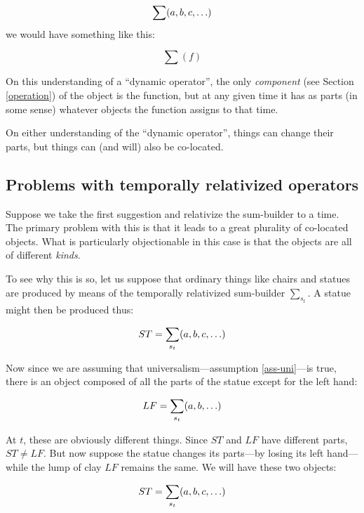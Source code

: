 \documentclass[11pt]{article}
\begin{document}
\begin{spacing}{1.5}
\begin{displaymath}
\sum (a, b, c, \mathellipsis )
\end{displaymath}
we would have something like this:

\begin{displaymath}
\sum ( f )
\end{displaymath}

On this understanding of a ``dynamic operator'', the only {\em
  component} (see Section \ref{operation}) of the object is the
function, but at any given time it has as parts (in some sense)
whatever objects the function assigns to that time.

On either understanding of the ``dynamic operator'', things can change
their parts, but things can (and will) also be co-located.

\subsection{Problems with temporally relativized operators}
\label{problems2a}
Suppose we take the first suggestion and relativize the sum-builder to
a time.  The primary problem with this is that it leads to a great
plurality of co-located objects.  What is particularly objectionable
in this case is that the objects are all of different {\em kinds}.

To see why this is so, let us suppose that ordinary things like chairs
and statues are produced by means of the temporally relativized
sum-builder $\sum_{s_t}$.  A statue might then be produced thus:

\begin{displaymath}
ST = \sum_{s_t} (a, b, c, \mathellipsis )
\end{displaymath}

Now since we are assuming that universalism---assumption
\ref{ass-uni}---is true, there is an object composed of all the parts
of the statue except for the left hand:

\begin{displaymath}
LF = \sum_{s_t} (a, b, \mathellipsis )
\end{displaymath}

At $t$, these are obviously different things.  Since $ST$ and $LF$
have different parts, $ST \neq LF$.  But now suppose the statue
changes its parts---by losing its left hand---while the lump of clay
$LF$ remains the same.  We will have these two objects:

\begin{displaymath}
ST = \sum_{s_t} (a, b, c, \mathellipsis )
\end{displaymath}


\end{spacing}
\end{document}
